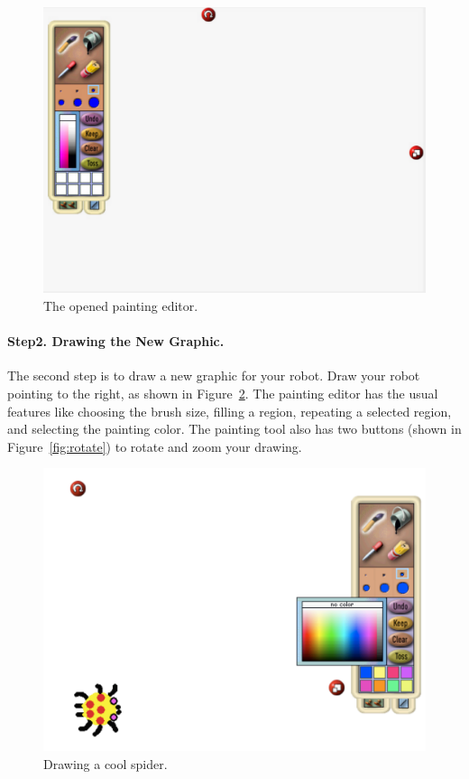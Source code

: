 \begin{figure}[h]
\begin{center}
\includegraphics[width=14cm]{paintOpen}
\caption{The opened painting editor. \label{fig:paintOpen}}
\end{center}
\end{figure}

\newpage

\paragraph{Step2. Drawing the New Graphic.} The second step is to draw a new graphic for your robot. Draw your robot pointing to the right, as shown in Figure~\ref{fig:palette}. The painting editor has the usual features like choosing the brush size, filling a region, repeating a selected region, and selecting the painting color. The painting tool also has two buttons (shown in Figure~\ref{fig:rotate})  to rotate and zoom your drawing. 

\begin{figure}[h]
\begin{center}
\includegraphics[width=12cm]{editingSpider}
\end{center}
\caption{Drawing a cool spider. \label{fig:palette}}
\end{figure}

